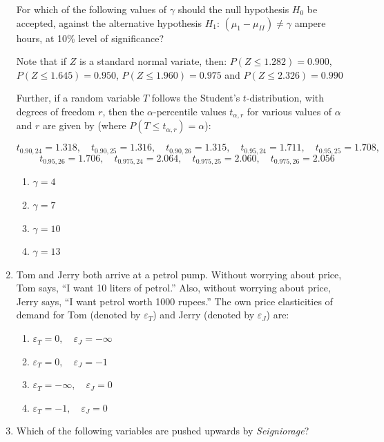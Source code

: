 \documentclass[journal,12pt,onecolumn]{exam}
\theoremstyle{remark}
\begin{document}
\begin{enumerate}
  For which of the following values of $\gamma$ should the null hypothesis $H_0$ be accepted, against the alternative hypothesis $H_1$: $(\mu_1 - \mu_{II}) \neq \gamma$ ampere hours, at 10\% level of significance?

  Note that if $Z$ is a standard normal variate, then: $P(Z \leq 1.282) = 0.900$, $P(Z \leq 1.645) = 0.950$, $P(Z \leq 1.960) = 0.975$ and $P(Z \leq 2.326) = 0.990$

  Further, if a random variable $T$ follows the Student's $t$-distribution, with degrees of freedom $r$, then the $\alpha$-percentile values $t_{\alpha,r}$ for various values of $\alpha$ and $r$ are given by (where $P(T \leq t_{\alpha,r}) = \alpha$):

  \[
  t_{0.90,24} = 1.318, \quad t_{0.90,25} = 1.316, \quad t_{0.90,26} = 1.315, \quad t_{0.95,24} = 1.711, \quad t_{0.95,25} = 1.708,\]
  \[\quad t_{0.95,26} = 1.706, \quad t_{0.975,24} = 2.064, \quad t_{0.975,25} = 2.060, \quad t_{0.975,26} = 2.056
  \]


  \begin{enumerate}
    \item $\gamma = 4$
    \item $\gamma = 7$
    \item $\gamma = 10$
    \item $\gamma = 13$
  \end{enumerate}

  \newpage

  \item Tom and Jerry both arrive at a petrol pump. Without worrying about price, Tom says, ``I want 10 liters of petrol.'' Also, without worrying about price, Jerry says, ``I want petrol worth 1000 rupees.'' The own price elasticities of demand for Tom (denoted by $\varepsilon_T$) and Jerry (denoted by $\varepsilon_J$) are:
  
  \begin{enumerate}
    \item $\varepsilon_T = 0, \quad \varepsilon_J = -\infty$
    \item $\varepsilon_T = 0, \quad \varepsilon_J = -1$
    \item $\varepsilon_T = -\infty, \quad \varepsilon_J = 0$
    \item $\varepsilon_T = -1, \quad \varepsilon_J = 0$
  \end{enumerate}

  \item Which of the following variables are pushed upwards by \textit{Seigniorage}?


\end{enumerate}
\end{document}

